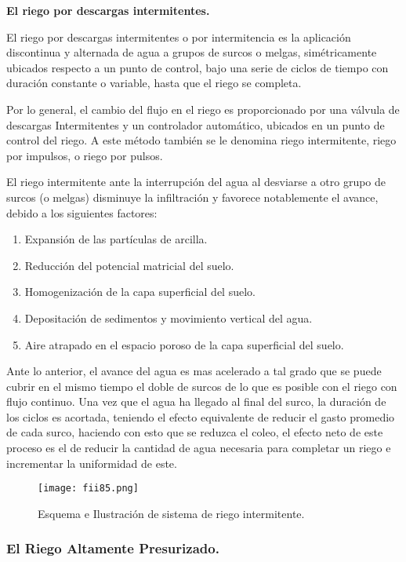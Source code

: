 \textbf{El riego por descargas intermitentes.}

El riego por descargas intermitentes o por intermitencia es la aplicación
discontinua y alternada de agua a grupos de surcos o melgas, simétricamente ubicados
respecto a un punto de control, bajo una serie de ciclos de tiempo con duración
constante o variable, hasta que el riego se completa.

Por lo general, el cambio del flujo en el riego es proporcionado por una válvula de
descargas Intermitentes y un controlador automático, ubicados en un punto de control
del riego. A este método también se le denomina riego intermitente, riego por impulsos,
o riego por pulsos.

El riego intermitente ante la interrupción del agua al desviarse a otro grupo de
surcos (o melgas) disminuye la infiltración y favorece notablemente el avance, debido a
los siguientes factores:

\begin{enumerate}
	\item Expansión de las partículas de arcilla.
	\item Reducción del potencial matricial del suelo.
	\item Homogenización de la capa superficial del suelo.
	\item Depositación de sedimentos y movimiento vertical del agua.
	\item Aire atrapado en el espacio poroso de la capa superficial del suelo.
\end{enumerate}

Ante lo anterior, el avance del agua es mas acelerado a tal grado que se puede
cubrir en el mismo tiempo el doble de surcos de lo que es posible con el riego con flujo
continuo. Una vez que el agua ha llegado al final del surco, la duración de los ciclos es
acortada, teniendo el efecto equivalente de reducir el gasto promedio de cada surco,
haciendo con esto que se reduzca el coleo, el efecto neto de este proceso es el de
reducir la cantidad de agua necesaria para completar un riego e incrementar la
uniformidad de este.

\begin{figure}[h!]
	\centerline{\texttt{[image: fii85.png]}}
	\caption{Esquema e Ilustración de sistema de riego intermitente.}
	\label{fii85}
\end{figure}

\subsubsection{El Riego Altamente Presurizado.}

